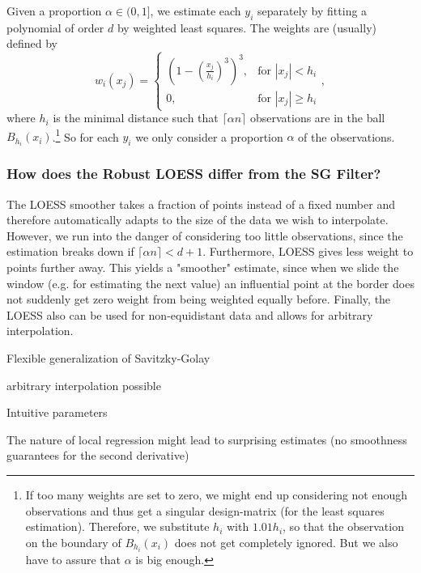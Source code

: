 		Given a proportion $\alpha \in (0,1]$, we estimate each $y_i$ separately by fitting a polynomial of order $d$ by weighted least squares. The weights are (usually) defined by
		$$w_i(x_j)=\begin{cases}
				\left(1-\left(\frac{x_j}{h_i}\right)^{3}\right)^{3}, & \text{for } |x_j|<h_i           \\
				0,                                                   & \text{for } |x_j| \geqslant h_i
			\end{cases} ,$$
		where $h_i$ is the minimal distance such that $\lceil \alpha n\rceil$ observations are in the ball $B_{h_i}(x_i)$.\footnote{\label{footnote:LOESS}If too many weights are set to zero, we might end up considering not enough observations and thus get a singular design-matrix (for the least squares estimation). Therefore, we substitute $h_i$ with $1.01 h_i$, so that the observation on the boundary of $B_{h_i}(x_i)$ does not get completely ignored. But we also have to assure that $\alpha$ is big enough.} So for each $y_i$ we only consider a proportion $\alpha$ of the observations.

		\subsubsection{How does the Robust LOESS differ from the SG Filter?}
		The LOESS smoother takes a fraction of points instead of a fixed number and therefore automatically adapts to the size of the data we wish to interpolate. However, we run into the danger of considering too little observations, since the estimation breaks down if $\lceil \alpha n\rceil < d+1$.
		Furthermore, LOESS gives less weight to points further away. This yields a "smoother" estimate, since when we slide the window (e.g. for estimating the next value) an influential point at the border does not suddenly get zero weight from being weighted equally before.
		Finally, the LOESS also can be used for non-equidistant data and allows for arbitrary interpolation.

		\begin{my_pros_cons_table}{
				\item Flexible generalization of Savitzky-Golay
				\item arbitrary interpolation possible
				\item Intuitive parameters
			}{
				\item The nature of local regression might lead to surprising estimates (no smoothness guarantees for the second derivative)
			}
		\end{my_pros_cons_table}


